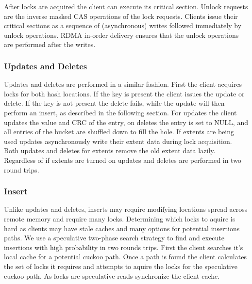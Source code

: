 
After locks are acquired the client can execute its critical
section. Unlock requests are the inverse masked CAS operations of the
lock requests. Clients issue their critical sections as a sequence of
(asynchronous) writes followed immediately by unlock operations. RDMA
in-order delivery ensures that the unlock operations are performed
after the writes.

\subsubsection{Updates and Deletes}

Updates and deletes are performed in a similar fashion.
First the client acquires locks for both hash locations. If
the key is present the client issues the update or delete.
If the key is not present the delete fails, while the update
will then perform an insert, as described in the following
section. For updates the client updates the value and CRC of
the entry, on deletes the entry is set to NULL, and all
entries of the bucket are shuffled down to fill the hole.
If extents are being used updates asynchronously write their
extent data during lock acquisition. Both updates and
deletes for extents remove the old extent data lazily.
Regardless of if extents are turned on updates and deletes
are performed in two round trips.

\subsubsection{Insert}

Unlike updates and deletes, inserts may require modifying
locations spread across remote memory and require many
locks. Determining which locks to aquire is hard as clients
may have stale caches and many options for potential
insertions paths.  We use a speculative two-phase search
strategy to find and execute insertions with high
probability in two rounds trips. First the client searches
it's local cache for a potential cuckoo path. Once a path is
found the client calculates the set of locks it requires and
attempts to aquire the locks for the speculative cuckoo
path. As locks are speculative reads synchronize the client
cache.

